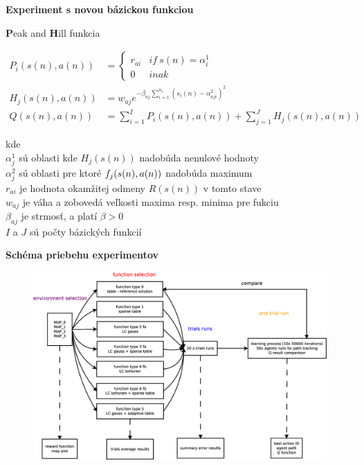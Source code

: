 \documentclass[xcolor=dvipsnames]{beamer}
\begin{document}
\begin{frame}{\bf Experiment s novou bázickou funkciou}

{\bf P}eak and {\bf H}ill funkcia

\begin{align}
P_i(s(n), a(n)) &=
\left\{
	\begin{array}{ll}
		r_{ai}  & if \ s(n) = \alpha^1_i \\
		0 & inak
	\end{array}
\right. \\
  H_j(s(n), a(n)) &= w_{aj} e^{ -\beta_{aj} \sum\limits_{i=1}^{n_s}{(s_i(n) - \alpha^2_{aji})^2 }} \\
  Q(s(n), a(n)) &= \sum\limits_{i=1}^{I} P_i(s(n),a(n)) + \sum\limits_{j=1}^{J} H_j(s(n), a(n))
  \label{eq:peak_hill}
\end{align}

kde \\
$\alpha^1_j$ sú oblasti kde $H_j(s(n))$ nadobúda nenulové hodnoty \\
$\alpha^2_j$ sú oblasti pre ktoré $f_j(\boldmath{s(n), a(n)})$ nadobúda maximum \\
$r_{ai}$ je hodnota okamžitej odmeny $R(s(n))$ v tomto stave \\
$w_{aj}$ je váha a zobovedá veľkosti maxima resp. minima pre fukciu \\
$\beta_{aj}$ je strmosť, a platí $\beta > 0$ \\
$I$ a $J$ sú počty bázických funkcií \\

\end{frame}


\begin{frame}{\bf Schéma priebehu experimentov}

\begin{figure}[!htb]
\centering
\includegraphics[scale=.22]{../diagrams/experiment_map_q_learning.eps}
\end{figure}

\end{frame}
\end{document}
